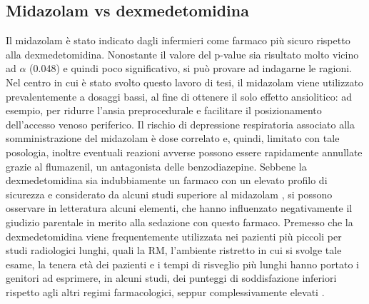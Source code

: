 \subsection*{Midazolam vs dexmedetomidina}
Il midazolam è stato indicato dagli infermieri come farmaco più sicuro rispetto alla dexmedetomidina. Nonostante il valore del p-value sia risultato molto vicino ad $\alpha$ (0.048) e quindi poco significativo, si può provare ad indagarne le ragioni. Nel centro in cui è stato svolto questo lavoro di tesi, il midazolam viene utilizzato prevalentemente a dosaggi bassi, al fine di ottenere il solo effetto ansiolitico: ad esempio, per ridurre l’ansia preprocedurale e facilitare il posizionamento dell’accesso venoso periferico. Il rischio di depressione respiratoria associato alla somministrazione del midazolam è dose correlato e, quindi, limitato con tale posologia, inoltre eventuali reazioni avverse possono essere rapidamente annullate grazie al flumazenil, un antagonista delle benzodiazepine. Sebbene la dexmedetomidina sia indubbiamente un farmaco con un elevato profilo di sicurezza \citep{Sulton2016} e considerato da alcuni studi superiore al midazolam \citep{Barends2017, Lin}, si possono osservare in letteratura alcuni elementi, che hanno influenzato negativamente il giudizio parentale in merito alla sedazione con questo farmaco. Premesso che la dexmedetomidina viene frequentemente utilizzata nei pazienti più piccoli per studi radiologici lunghi, quali la RM, l’ambiente ristretto in cui si svolge tale esame, la tenera età dei pazienti e i tempi di risveglio più lunghi hanno portato i genitori ad esprimere, in alcuni studi, dei punteggi di soddisfazione inferiori rispetto agli altri regimi farmacologici, seppur complessivamente elevati \citep{Lew2010, Cortellazzo2022}. 









